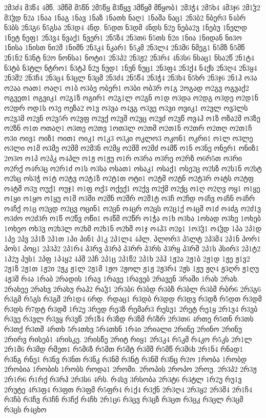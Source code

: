 {2მ3ძ4
მ3წ4
4მწ.
3მწმ
მ5წნ
2მ5წყ
მ3წყვ
3მწყმ
მწყობ1
2მ3ჭ4
2მ5ხ4
4მ3ჯ6
2მ1ჴ2
მ3ჴდ
ნ2ა
1ნაა
1ნაგ
1ნავ
1ნაზ
1ნათხ
ნაღ1
1ნაშა
ნაც1
2ნ3ბ2
ნბერ3
ნ4ბრ
ნ3ბს
2ნ3გ6
ნ5გსა
2ნ3დ4
4ნდ.
ნ5დთ
ნ3დმ
4ნდს
ნ2ე
ნება2ვ
1ნებუ
1ნელდ
1ნეტ
ნეფ1
2ნ3ვ4
ნვაქ1
ნვერ1
2ნ5ზ4
2ნ3თ6
ნ5თს
ნ2ი
1ნია
1ნიდან
ნი3ო
1ნისა
1ნისთ
ნი2შ
1ნიშნ
2ნ3კ4
ნკარ1
ნ5კმ
2ნ3ლ4
2ნ3მ6
ნმეგ1
ნ5მზ
ნ5მწ
2ნ1ნ2
ნ3ნტ
ნ2ო
ნონსა1
ნოტი1
2ნ3პ2
2ნ3ჟ2
2ნ3რ4
4ნ3ს6
ნსაც1
ნსა2წ
2ნ1ტ4
ნ3ტბ
ნ3ტლ
ნტრო1
ნ3ტჰ
ნ2უ
ნუდ1
1ნუნ
ნუც1
2ნ3ფ4
2ნ3ქ4
ნ4ქს
2ნ3ღ4
2ნ3ყ4
2ნ3შ2
2ნ3ჩ4
2ნ3ც4
ნ3ცლ
ნ3ცმ
2ნ3ძ4
2ნ5წ4
2ნ3ჭ4
2ნ3ხ4
ნ5ხრ
2ნ3ჯ6
2ნ1ჰ
ო3ა
ო2აა
ოათ1
ოაღ1
ო1ბ
ო3ბე
ობერ1
ო3ბი
ობ3რ
ო1გ
2ოგად
ო2გვ
ოგვაქ2
ოგვეთ1
ოგვიკ1
ო2გ1ზ
ოგირ1
ო2გ1ლ
ო2გნ
ო1დ
ო3და
ო2დგ
ო3დე
ო2დ1ნ
ო2დრ
ოდ1ს
ო3ე
ოეზა2
ო1ვ
ო3ვა
ო4ვგ
ო3ვე
ო3ვი
ოვიკ1
ო2ვლ
ოვ3ლს
ო2ვ3მ
ო2ვნ
ო2ვ5რ
ო2ვფ
ო2ვქ
ო2ვშ
ო2ვც
ო2ვძ
ო2ვწ
ოვ4ჰ
ო1ზ
ოზა2მ
ო3ზე
ო2ზნ
ო1თ
ოთაღ1
ო3თე
ო2თვ
1ოთ3ლ
ო2თმ
ო2თ1ნ
ო2თრ
ო2თღ
ო2თ1ჩ
ო3ი
ოივ1
ოიზ1
ოით1
ოიკ1
ო1კ3
ო3კი
ოკლო3
ოკონ1
ოკრი1
ო1ლ
ო3ლე
ო3ლი
ო1მ
ო3მე
ო2მმ
ო2მ3ნ
ო2მყ
ო2მშ
ო2მძ
ო4მწ
ო1ნ
ო3ნე
ონერ1
ონიზ1
2ო3ო
ო1პ
ო2პკ
ო4პლ
ო1ჟ
ო1ჟუ
ო1რ
ო3რა
ო3რე
ო2რზ
ო6რ5თ
ო3რი
ო2რქ
ო4რ3ც
ო2რ1ძ
ო1ს
ო3სა
ოსათ1
ოსაკ1
ოსაქ1
ოსე2ც
ო2სზ
ო2ს1ნ
ო2სტ
ო2სც
ოს3ჭ
ო1ტ
ო2ტვ
ო2ტ1ზ
ო2ტ1თ
ოტი1
ო2ტმ
ო2ტნ
ო2ტ3რ
ო4ტს
ო2ტფ
ო4ტშ
ო3უ
ოუქ1
ოუჯ1
ო1ფ
ოქ3
ოქექ1
ო2ქვ
ო2ქმ
ო2ქც
ო1ღ
ო2ღვ
ოყ1
ო1ყე
ო1ყი
ო1ყო
ო1ყუ
ო1შ
ო3ში
ო2შნ
ო2შრ
ო2შ1ტ
ო3ჩ
ო2ჩდ
ო4ჩვ
ო4ჩნ
ო4ჩრ
ო4ჩქ
ო1ც
ო2ცდ
ო2ცვ
ოცინ1
ო2ცნ
ო4ცრ
ო2ცს
ო2ც1ქ
ო4ცშ
ო1ძ
ო4ძგ
ო2ძ1ვ
ო3ძო
ო2ძ3რ
ო1წ
ო2წვ
ოწი1
ო4წმ
ო2წრ
ო1ჭა
ო1ხ
ო3ხა
1ოხად
ო3ხე
1ოხებ
1ოხეო
ოხ3ვ
ო2ხ3ლ
ო2ხმ
ო2ხ1ნ
ო2ხშ
ო1ჯ
ო4ჰ3
ო2ჲ1
1ო3ჴ1
ო4ჴდ
1პა
2პ1დ
1პე
2პვ
2პ1ზ
2პ1თ
1პი
პინ1
პ1კ
2პ1ლ4
4პლ.
პლორ3
პ5ლტ
2პ3მ4
2პ1ნ
პორ1
პოს1
პოც1
2პ3პ2
2პ1რ4
პ3რვ
პ3რპ
პ3რრ
პ3რს
პ3რყ
პ3რშ
2პ1ს
პსირ3
2პ1ტ2
1პ2უ
პუს1
2პფ
1პ4ყ2
4პშ
2პჩ
2პ1ც
2პ1წ2
2პ1ხ
2პჰ
1ჟ2ა
2ჟ1ბ
2ჟ1დ
1ჟე
ჟ1ვ2
2ჟ1ზ
2ჟ1თ
1ჟ2ი
2ჟკ
ჟ1ლ
2ჟ1მ
1ჟო
2ჟოლ
ჟ1ჟ
2ჟ3რ4
2ჟს
1ჟუ
ჟღ4
ჟ3ღრ
ჟ1ღუ
4ჟ3შ
რ4ა
1რაბ
2რადის
1რავ
1რავე
1რავებ
2რავენ
3რაში
1რახ
2რახ.
2რახეე
2რახვ
2რახუ
რაჰ2
რაჴ1
2რ3ბ6
რ3ბდ
რ3ბზ
რ3ბლ
რ3ბმ
რბრ6
2რ3გ6
რ3გმ
რ5გს
რ3გშ
2რ1დ4
6რდ.
რდაც1
რ3დბ
რ3დდ
რ3დვ
რ3დზ
რ5დთ
რ3დმ
რ3დს
რ7დტ
რ3დშ
1რ2ე
3რედ
რე3ზ
რემარ3
რესუ1
2რეტ
რე1ყ
2რ1ვ4
რ3ვბ
რ3ვე
რ3ვლ
რ3ვყ
რ3ვწ
2რ1ზ4
რ3ზდ
რ3ზმ
რ5ზრ
2რ3თ6
4რთე
რ5თნ
რ3თს
რ3თქ
რ3თშ
4რთხ
5რ4თხვ
5რ4თხნ
1რ4ი
2რიალი
2რინე
2რინო
2რინუ
2რირვ
რისებ1
4რისკე.
2რისწე
2რიტ
რიყ1
2რ3კ4
რ5კმ
რ4კო
რ5კს
2რ1ლ
2რ1მ6
რ3მდ
რმეთ1
რ5მ6ზ
რ5მთ
რ5მტ
რ3მშ
რ5მწ
რ3მ6ხ
2რ1ნ4
რნად1
რ3ნგ
რნე1
რ3ნვ
რ3ნთ
რ3ნკ
რ3ნმ
რ3ნტ
რ3ნშ
რ3ნც
რ2ო
1რობა
1რობდ
2რობია
1რობის
1რობს
როდა1
2რომი.
2როპის
2როპო
2როუ.
2რ3პ2
2რ3ჟ
2რ1რ6
რ1რქ
რ3რჰ
2რ3ს6
4რს.
რ4სვ
3რსობა
2რ3ტ6
რ3ტლ
1რ2უ
რუ1ვ
2რუტე
4რ3ფ4
რ3ფთ
რ3ფმ
რ5ფრ4
რ1ქ4
რ3ქნ
2რ3ღ4
2რ3ყ2
2რ3შ4
2რ1ჩ4
რ3ჩბ
რ3ჩვ
რ3ჩნ
რ3ჩქ
რ4ჩხ
2რ1ც6
რ3ცვ
რ3ცზ
რ3ცთ
რ3ცკ
რ3ცლ
რ3ცმ
რ3ცს
რ4ცხო
}
